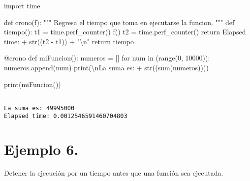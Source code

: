 \documentclass[
  letterpaper,
  DIV=11,
  numbers=noendperiod]{scrreprt}
\newenvironment{Shaded}{\begin{snugshade}}{\end{snugshade}}
\newcommand{\AttributeTok}[1]{\textcolor[rgb]{0.40,0.45,0.13}{#1}}
\newcommand{\BuiltInTok}[1]{\textcolor[rgb]{0.00,0.23,0.31}{#1}}
\newcommand{\CharTok}[1]{\textcolor[rgb]{0.13,0.47,0.30}{#1}}
\newcommand{\CommentTok}[1]{\textcolor[rgb]{0.37,0.37,0.37}{#1}}
\newcommand{\ControlFlowTok}[1]{\textcolor[rgb]{0.00,0.23,0.31}{#1}}
\newcommand{\DecValTok}[1]{\textcolor[rgb]{0.68,0.00,0.00}{#1}}
\newcommand{\ImportTok}[1]{\textcolor[rgb]{0.00,0.46,0.62}{#1}}
\newcommand{\KeywordTok}[1]{\textcolor[rgb]{0.00,0.23,0.31}{#1}}
\newcommand{\NormalTok}[1]{\textcolor[rgb]{0.00,0.23,0.31}{#1}}
\newcommand{\OperatorTok}[1]{\textcolor[rgb]{0.37,0.37,0.37}{#1}}
\newcommand{\StringTok}[1]{\textcolor[rgb]{0.13,0.47,0.30}{#1}}
\begin{document}
\begin{Shaded}
\begin{Highlighting}[]
\ImportTok{import}\NormalTok{ time}

\KeywordTok{def}\NormalTok{ crono(f):}
    \CommentTok{"""}
\CommentTok{    Regresa el tiempo que toma en ejecutarse la funcion.}
\CommentTok{    """}
    \KeywordTok{def}\NormalTok{ tiempo():}
\NormalTok{        t1 }\OperatorTok{=}\NormalTok{ time.perf\_counter()}
\NormalTok{        f()}
\NormalTok{        t2 }\OperatorTok{=}\NormalTok{ time.perf\_counter()}
        \ControlFlowTok{return} \StringTok{\textquotesingle{}Elapsed time: \textquotesingle{}} \OperatorTok{+} \BuiltInTok{str}\NormalTok{((t2 }\OperatorTok{{-}}\NormalTok{ t1)) }\OperatorTok{+} \StringTok{"}\CharTok{\textbackslash{}n}\StringTok{"}
    \ControlFlowTok{return}\NormalTok{ tiempo}

\AttributeTok{@crono}
\KeywordTok{def}\NormalTok{ miFuncion():}
\NormalTok{    numeros }\OperatorTok{=}\NormalTok{ []}
    \ControlFlowTok{for}\NormalTok{ num }\KeywordTok{in}\NormalTok{ (}\BuiltInTok{range}\NormalTok{(}\DecValTok{0}\NormalTok{, }\DecValTok{10000}\NormalTok{)):}
\NormalTok{        numeros.append(num)}
    \BuiltInTok{print}\NormalTok{(}\StringTok{\textquotesingle{}}\CharTok{\textbackslash{}n}\StringTok{La suma es: \textquotesingle{}} \OperatorTok{+} \BuiltInTok{str}\NormalTok{((}\BuiltInTok{sum}\NormalTok{(numeros))))}

\BuiltInTok{print}\NormalTok{(miFuncion())}
\end{Highlighting}
\end{Shaded}

\begin{verbatim}

La suma es: 49995000
Elapsed time: 0.0012546591460704803
\end{verbatim}

\section{\texorpdfstring{\textbf{Ejemplo
6.}}{Ejemplo 6.}}\label{ejemplo-6.-3}

Detener la ejecución por un tiempo antes que una función sea ejecutada.
\end{document}
